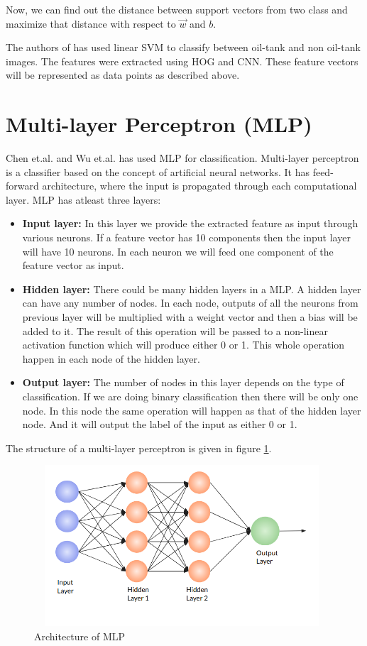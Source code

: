 Now, we can find out the distance between support vectors from two class and maximize that distance with respect to $\vec{w}$ and $b$. 

\par The authors of \cite{b6} has used linear SVM to classify between oil-tank and non oil-tank images. The features were extracted using HOG and CNN. These feature vectors will be represented as data points as described above. 


\section{Multi-layer Perceptron (MLP)}
\par Chen et.al. \cite{b8} and Wu et.al. \cite{b5} has used MLP for classification. Multi-layer perceptron is a classifier based on the concept of artificial neural networks. It has feed-forward architecture, where the input is propagated through each computational layer. MLP has atleast three layers:
\begin{itemize}
    \item \textbf{Input layer: } In this layer we provide the extracted feature as input through various neurons. If a feature vector has 10 components then the input layer will have 10 neurons. In each neuron we will feed one component of the feature vector as input.
    \item \textbf{Hidden layer: }There could be many hidden layers in a MLP. A hidden layer can have any number of nodes. In each node, outputs of all the neurons from previous layer will be multiplied with a weight vector and then a bias will be added to it. The result of this operation will be passed to a non-linear activation function which will produce either 0 or 1. This whole operation happen in each node of the hidden layer.
    \item \textbf{Output layer: }The number of nodes in this layer depends on the type of classification. If we are doing binary classification then there will be only one node. In this node the same operation will happen as that of the hidden layer node. And it will output the label of the input as either 0 or 1. 
\end{itemize}
The structure of a multi-layer perceptron is given in figure \ref{fig14}.

\begin{figure}[!htbp]
\centerline{\includegraphics[height=60mm,width=110mm]{img/fig14.png}}
\caption{Architecture of MLP}
\label{fig14}
\end{figure}

